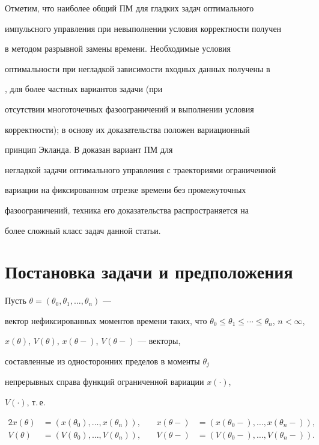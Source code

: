 Отметим, что наиболее общий ПМ для гладких задач оптимального


импульсного управления при невыполнении условия корректности получен


в \cite{80} методом разрывной замены времени. Необходимые условия


оптимальности при негладкой зависимости входных данных получены в


\cite{83}, \cite{Diz.vuz} для более частных вариантов задачи (при


отсутствии многоточечных фазоограничений и выполнении условия


корректности); в основу их доказательства положен вариационный


принцип Экланда. В \cite{DS99} доказан вариант ПМ для


негладкой задачи оптимального управления с траекториями ограниченной


вариации на фиксированном отрезке времени без промежуточных


фазоограничений, техника его доказательства распространяется на


более сложный класс задач данной статьи.





\section{Постановка задачи и предположения}








Пусть $\theta=(\theta_0,\theta_1,\dotsc,\theta_n)$ ---


вектор нефиксированных моментов времени таких, что $\theta_0\leq


\theta_1\leq \dotsb \leq \theta_n$, $n< \infty$,


$x(\theta)$, $V(\theta)$, $x(\theta-)$, $V(\theta-)$ --- векторы,


составленные из односторонних пределов в моменты $\theta_j$


непрерывных справа функций ограниченной вариации $x(\cdot)$,


$V(\cdot)$, т.\,е.


\begin{alignat*}{2}


x(\theta)&=(x(\theta_0),\dotsc,x(\theta_n)),&\quad


x(\theta-)&=(x(\theta_0-),\dotsc,x(\theta_n-)),\\


V(\theta)&=(V(\theta_0),\dotsc,V(\theta_n)),


&\quad V(\theta-)&=(V(\theta_0-),\dotsc,V(\theta_n-)).


\end{alignat*}





